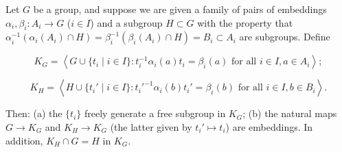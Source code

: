 Let $G$ be a group, and suppose we are given a family of pairs of embeddings $\alpha_i, \beta_i : A_i \rightarrow G$ ($i \in I$) and a subgroup $H \subset G$ with the property that $\alpha_i^{-1}(\alpha_i(A_i) \cap H) = \beta_i^{-1}(\beta_i(A_i) \cap H) = B_i \subset A_i$ are subgroups. Define

$$K_G = \left\langle G \cup \{t_i \mid i \in I\} : t_i^{-1}\alpha_i(a)t_i = \beta_i(a) \text{ for all } i \in I, a \in A_i \right\rangle;$$

$$K_H = \left\langle H \cup \{t_i' \mid i \in I\} : t_i'^{-1}\alpha_i(b)t_i' = \beta_i(b) \text{ for all } i \in I, b \in B_i \right\rangle.$$

Then:
(a) the $\{t_i\}$ freely generate a free subgroup in $K_G$;
(b) the natural maps $G \rightarrow K_G$ and $K_H \rightarrow K_G$ (the latter given by $t_i' \mapsto t_i$) are embeddings. In addition, $K_H \cap G = H$ in $K_G$.
